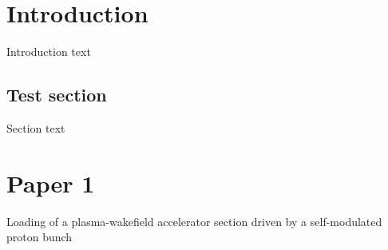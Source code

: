 \documentclass[twoside,openright,12pt]{book}
\begin{document}
\frontmatter
    
    
    
    \tableofcontents

\mainmatter
\chapter{Introduction}
Introduction text
\section{Test section}
Section text
\chapter{Paper 1}
Loading of a plasma-wakefield accelerator section driven by a self-modulated proton bunch


\appendix
\backmatter
\end{document}
